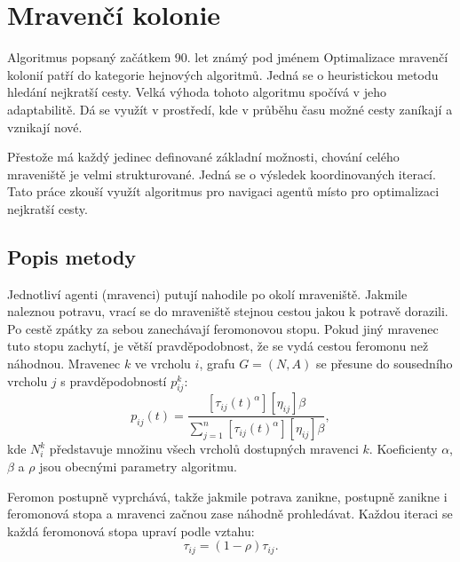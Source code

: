\section{Mravenčí kolonie}
Algoritmus popsaný začátkem 90. let známý pod jménem Optimalizace mravenčí kolonií patří do kategorie hejnových algoritmů. \cite{Colorni1991} Jedná se o heuristickou metodu hledání nejkratší cesty. Velká výhoda tohoto algoritmu spočívá v jeho adaptabilitě. Dá se využít v prostředí, kde v průběhu času možné cesty zaníkají a vznikají nové. 
\par
Přestože má každý jedinec definované základní možnosti, chování celého mraveniště je velmi strukturované. Jedná se o výsledek koordinovaných iterací. Tato práce zkouší využít algoritmus pro navigaci agentů místo pro optimalizaci nejkratší cesty. 

\subsection{Popis metody}
Jednotliví agenti (mravenci) putují nahodile po okolí mraveniště. Jakmile naleznou potravu, vrací se do mraveniště stejnou cestou jakou k potravě dorazili. Po cestě zpátky za sebou zanechávají feromonovou stopu. Pokud jiný mravenec tuto stopu zachytí, je větší pravděpodobnost, že se vydá cestou feromonu než náhodnou. Mravenec $k$ ve vrcholu $i$, grafu $G = (N, A)$ se přesune do sousedního vrcholu $j$ s pravděpodobností $p_{ij}^k$:  
\begin{equation*}
p_{ij}(t) = \frac{[\tau_{ij}(t)^\alpha] [\eta_{ij}]\beta}{\sum\limits_{j=1}^n{[\tau_{ij}(t)^\alpha] [\eta_{ij}]\beta}},
\end{equation*}
kde $N_i^k$ představuje množinu všech vrcholů dostupných mravenci $k$. Koeficienty $\alpha$, $\beta$ a $\rho$ jsou obecnými parametry algoritmu. 
\par
Feromon postupně vyprchává, takže jakmile potrava zanikne, postupně zanikne i feromonová stopa a mravenci začnou zase náhodně prohledávat. Každou iteraci se každá feromonová stopa upraví podle vztahu:
\begin{equation*}
\tau_{ij} = (1 - \rho)\tau_{ij}.
\end{equation*}

